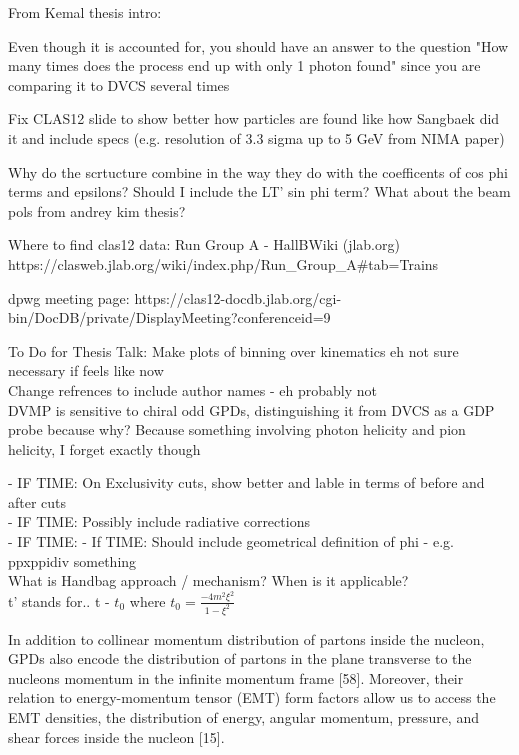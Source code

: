 




From Kemal thesis intro:

Even though it is accounted for, you should have an answer to the question "How many times does the process end up with only 1 photon found" since you are comparing it to DVCS several times

Fix CLAS12 slide to show better how particles are found like how Sangbaek did it and include specs (e.g. resolution of 3.3 sigma up to 5 GeV from NIMA paper)

Why do the scrtucture combine in the way they do with the coefficents of cos phi terms and epsilons? Should I include the LT' sin phi term? What about the beam pols from andrey kim thesis?

Where to find clas12 data:
Run Group A - HallBWiki (jlab.org)
https://clasweb.jlab.org/wiki/index.php/Run_Group_A#tab=Trains

dpwg meeting page: https://clas12-docdb.jlab.org/cgi-bin/DocDB/private/DisplayMeeting?conferenceid=9



To Do for Thesis Talk:
Make plots of binning over kinematics eh not sure necessary if feels like now\\
Change refrences to include author names - eh probably not\\

 DVMP is sensitive to chiral odd GPDs, distinguishing it from DVCS as a GDP probe because why? Because something involving photon helicity and pion helicity, I forget exactly though
 
 - IF TIME: On Exclusivity cuts, show better and lable in terms of before and after cuts\\
- IF TIME: Possibly include radiative corrections\\
- IF TIME: 
- If TIME: Should include geometrical definition of phi - e.g. ppxppidiv something\\

What is Handbag approach / mechanism? When is it applicable?\\
t' stands for.. t - $t_0$ where $t_0 = \frac{-4m^2\xi^2}{1-\xi^2}$


In addition to collinear momentum distribution of partons inside the
nucleon, GPDs also encode the distribution of partons in the plane transverse to
the nucleons momentum in the infinite momentum frame [58]. Moreover, their
relation to energy-momentum tensor (EMT) form factors allow us to access the
EMT densities, the distribution of energy, angular momentum, pressure, and shear
forces inside the nucleon [15].

